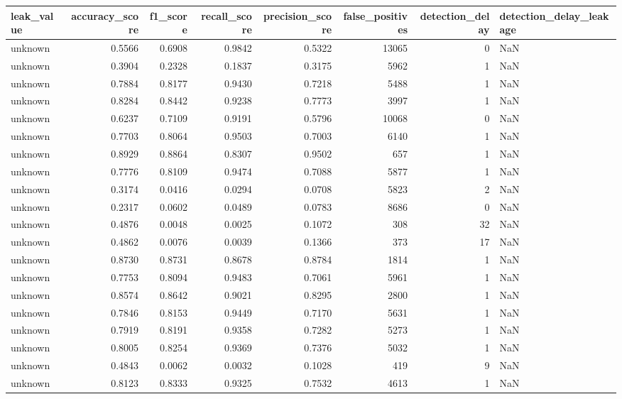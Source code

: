 \begin{tabular}{lrrrrrrl}
\toprule
leak\_value & accuracy\_score & f1\_score & recall\_score & precision\_score & false\_positives & detection\_delay & detection\_delay\_leakage \\
\midrule
unknown & 0.5566 & 0.6908 & 0.9842 & 0.5322 & 13065 & 0 & NaN \\
unknown & 0.3904 & 0.2328 & 0.1837 & 0.3175 & 5962 & 1 & NaN \\
unknown & 0.7884 & 0.8177 & 0.9430 & 0.7218 & 5488 & 1 & NaN \\
unknown & 0.8284 & 0.8442 & 0.9238 & 0.7773 & 3997 & 1 & NaN \\
unknown & 0.6237 & 0.7109 & 0.9191 & 0.5796 & 10068 & 0 & NaN \\
unknown & 0.7703 & 0.8064 & 0.9503 & 0.7003 & 6140 & 1 & NaN \\
unknown & 0.8929 & 0.8864 & 0.8307 & 0.9502 & 657 & 1 & NaN \\
unknown & 0.7776 & 0.8109 & 0.9474 & 0.7088 & 5877 & 1 & NaN \\
unknown & 0.3174 & 0.0416 & 0.0294 & 0.0708 & 5823 & 2 & NaN \\
unknown & 0.2317 & 0.0602 & 0.0489 & 0.0783 & 8686 & 0 & NaN \\
unknown & 0.4876 & 0.0048 & 0.0025 & 0.1072 & 308 & 32 & NaN \\
unknown & 0.4862 & 0.0076 & 0.0039 & 0.1366 & 373 & 17 & NaN \\
unknown & 0.8730 & 0.8731 & 0.8678 & 0.8784 & 1814 & 1 & NaN \\
unknown & 0.7753 & 0.8094 & 0.9483 & 0.7061 & 5961 & 1 & NaN \\
unknown & 0.8574 & 0.8642 & 0.9021 & 0.8295 & 2800 & 1 & NaN \\
unknown & 0.7846 & 0.8153 & 0.9449 & 0.7170 & 5631 & 1 & NaN \\
unknown & 0.7919 & 0.8191 & 0.9358 & 0.7282 & 5273 & 1 & NaN \\
unknown & 0.8005 & 0.8254 & 0.9369 & 0.7376 & 5032 & 1 & NaN \\
unknown & 0.4843 & 0.0062 & 0.0032 & 0.1028 & 419 & 9 & NaN \\
unknown & 0.8123 & 0.8333 & 0.9325 & 0.7532 & 4613 & 1 & NaN \\
\bottomrule
\end{tabular}
